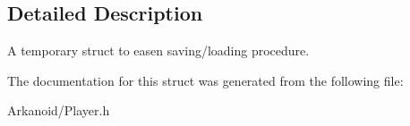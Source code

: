 \subsection{Detailed Description}
A temporary struct to easen saving/loading procedure. 

The documentation for this struct was generated from the following file\+:\begin{DoxyCompactItemize}
\item 
Arkanoid/Player.\+h\end{DoxyCompactItemize}
